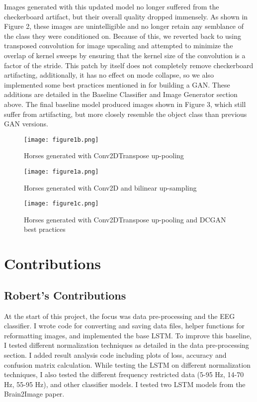 \documentclass[sigplan,screen]{acmart}
\begin{document}
Images generated with this updated model no longer suffered from the checkerboard artifact, but their overall quality dropped immensely. As shown in Figure 2, these images are unintelligible and no longer retain any semblance of the class they were conditioned on. Because of this, we reverted back to using transposed convolution for image upscaling and attempted to minimize the overlap of kernel sweeps by ensuring that the kernel size of the convolution is a factor of the stride. This patch by itself does not completely remove checkerboard artifacting, additionally, it has no effect on  mode collapse, so we also implemented some best practices mentioned in \cite{radford2016unsupervised} for building a GAN. These additions are detailed in the Baseline Classifier and Image Generator section above. The final baseline model produced images shown in Figure 3, which still suffer from artifacting, but more closely resemble the object class than previous GAN versions. 

\begin{figure}
\texttt{[image: figure1b.png]}
\caption{Horses generated with Conv2DTranspose up-pooling}
\end{figure}

\begin{figure}
\texttt{[image: figure1a.png]}
\caption{Horses generated with Conv2D and bilinear up-sampling}
\end{figure}

\begin{figure}
\texttt{[image: figure1c.png]}
\caption{Horses generated with Conv2DTranspose up-pooling and DCGAN best practices}
\end{figure}


\section{Contributions}

\subsection{Robert's Contributions}
At the start of this project, the focus was data pre-processing and the EEG classifier. I wrote code for converting and saving data files, helper functions for reformatting images, and implemented the base LSTM. To improve this baseline, I tested different normalization techniques as detailed in the data pre-processing section. I added result analysis code including plots of loss, accuracy and confusion matrix calculation. While testing the LSTM on different normalization techniques, I also tested the different frequency restricted data (5-95 Hz, 14-70 Hz, 55-95 Hz), and other classifier models. I tested two LSTM models from the Brain2Image paper. 
\end{document}
